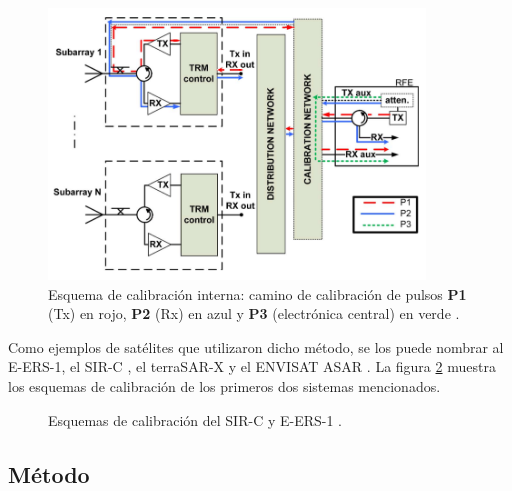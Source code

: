 \begin{figure}[H]
 \centering
 \includegraphics[width=10cm]{gfx/classic_cal_scheme.png}
 \caption{Esquema de calibración interna: camino de calibración de pulsos \textbf{P1} (Tx) en rojo, \textbf{P2} (Rx) en azul
 y \textbf{P3} (electrónica central) en verde \cite{Makhoul2012}.}
 \label{fig:classic_cal_scheme}
\end{figure}

Como ejemplos de satélites que utilizaron dicho método, se los puede nombrar al E-ERS-1, el SIR-C \cite{Curlander1991}, el
terraSAR-X \cite{Schwerdt2005} y el ENVISAT ASAR \cite{Loop}. La figura \ref{fig:calibrMethods} muestra los esquemas
de calibración de los primeros dos sistemas mencionados.

\begin{figure}[H]
	\centering
	\caption{Esquemas de calibración del SIR-C y E-ERS-1 \cite{Curlander1991}.}
	\label{fig:calibrMethods}
\end{figure}


\subsection{Método} \label{ssc:classicalMethod}

